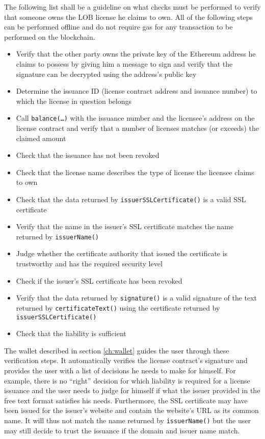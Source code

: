 \documentclass[a4paper]{article}
\begin{document}
The following list shall be a guideline on what checks must be performed to verify that someone owns the LOB license he claims to own. All of the following steps can be performed offline and do not require gas for any transaction to be performed on the blockchain.

\begin{itemize}
  \item Verify that the other party owns the private key of the Ethereum address he claims to possess by giving him a message to sign and verify that the signature can be decrypted using the address's public key
  \item Determine the issuance ID (license contract address and issuance number) to which the license in question belongs
  \item Call \texttt{balance(…)} with the issuance number and the licensee's address on the license contract and verify that a number of licenses matches (or exceeds) the claimed amount
  \item Check that the issuance has not been revoked
  \item Check that the license name describes the type of license the licensee claims to own
  \item Check that the data returned by \texttt{issuerSSLCertificate()} is a valid SSL certificate
  \item Verify that the name in the issuer's SSL certificate matches the name returned by \texttt{issuerName()}
  \item Judge whether the certificate authority that issued the certificate is trustworthy and has the required security level
  \item Check if the issuer's SSL certificate has been revoked
  \item Verify that the data returned by \texttt{signature()} is a valid signature of the text returned by \texttt{certificateText()} using the certificate returned by \texttt{issuerSSLCertificate()}
  \item Check that the liability is sufficient
\end{itemize}

The wallet described in section \ref{ch:wallet} guides the user through these verification steps. It automatically verifies the license contract's signature and provides the user with a list of decisions he needs to make for himself. For example, there is no “right” decision for which liability is required for a license issuance and the user needs to judge for himself if what the issuer provided in the free text format satisfies his needs. Furthermore, the SSL certificate may have been issued for the issuer's website and contain the website's URL as its common name. It will thus not match the name returned by \texttt{issuerName()} but the user may still decide to trust the issuance if the domain and issuer name match.
\end{document}
